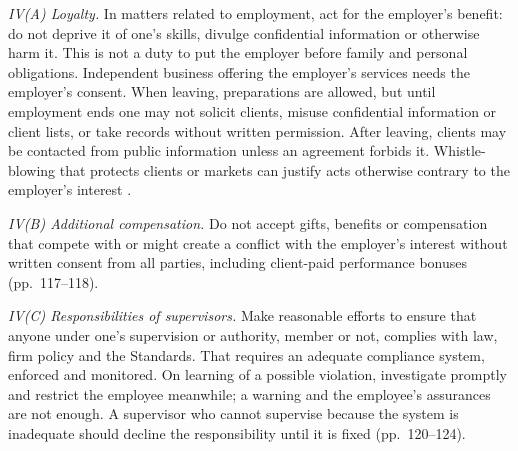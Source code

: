\begin{qfrule}\label{rule:standard-duties-to-employers}
 \emph{IV(A) Loyalty.} In matters related to employment, act for the employer's benefit: do not deprive it of one's skills, divulge confidential information or otherwise harm it. This is not a duty to put the employer before family and personal obligations. Independent business offering the employer's services needs the employer's consent. When leaving, preparations are allowed, but until employment ends one may not solicit clients, misuse confidential information or client lists, or take records without written permission. After leaving, clients may be contacted from public information unless an agreement forbids it. Whistle-blowing that protects clients or markets can justify acts otherwise contrary to the employer's interest \citep[pp.~107--111]{standards-practice-handbook-2024}.

\emph{IV(B) Additional compensation.} Do not accept gifts, benefits or compensation that compete with or might create a conflict with the employer's interest without written consent from all parties, including client-paid performance bonuses (pp.~117--118).

\emph{IV(C) Responsibilities of supervisors.} Make reasonable efforts to ensure that anyone under one's supervision or authority, member or not, complies with law, firm policy and the Standards. That requires an adequate compliance system, enforced and monitored. On learning of a possible violation, investigate promptly and restrict the employee meanwhile; a warning and the employee's assurances are not enough. A supervisor who cannot supervise because the system is inadequate should decline the responsibility until it is fixed (pp.~120--124).


\end{qfrule}
